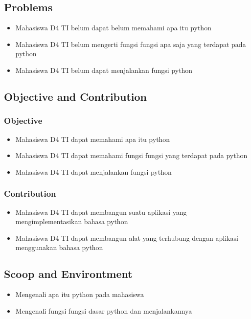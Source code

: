 \subsection{Problems}
\begin{itemize}
	\item Mahasiswa D4 TI belum dapat belum memahami apa itu python
    \item Mahasiswa D4 TI belum mengerti fungsi fungsi apa saja yang terdapat pada python
    \item Mahasiswa D4 TI belum dapat menjalankan fungsi python
\end{itemize}

\subsection{Objective and Contribution}
\subsubsection{Objective}
\begin{itemize}
	\item Mahasiswa D4 TI dapat memahami apa itu python
	\item Mahasiswa D4 TI dapat memahami fungsi fungsi yang terdapat pada python
	\item Mahasiswa D4 TI dapat menjalankan fungsi python
\end{itemize}
	
\subsubsection{Contribution}
\begin{itemize}
	\item Mahasiswa D4 TI dapat membangun suatu aplikasi yang mengimplementasikan bahasa python
	\item Mahasiswa D4 TI dapat membangun alat yang terhubung dengan aplikasi menggunakan bahasa python
\end{itemize}

\subsection{Scoop and Environtment}
\begin{itemize}
	\item Mengenali apa itu python pada mahasiswa
	\item Mengenali fungsi fungsi dasar python dan menjalankannya
\end{itemize}


